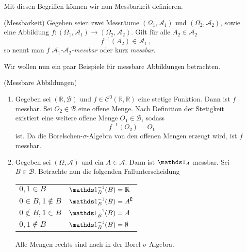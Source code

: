 \newpage

Mit diesen Begriffen können wir nun Messbarkeit definieren.

\begin{Definition}{(Messbarkeit)}
Gegeben seien zwei Messräume $(\Omega_1, \mathscr{A}_1)$ und $(\Omega_2, \mathscr{A}_2)$, sowie eine Abbildung $f: (\Omega_1, \mathscr{A}_1) \rightarrow (\Omega_2, \mathscr{A}_2)$. Gilt für alle $A_2 \in \mathscr{A}_2$
\[f^{-1}(A_2) \in \mathscr{A}_1~,\]
so nennt man $f$ \textit{$\mathscr{A}_1$-$\mathscr{A}_2$-messbar} oder kurz \textit{messbar}.
\end{Definition}

Wir wollen nun ein paar Beispiele für messbare Abbildungen betrachten.

\begin{Beispiel}{(Messbare Abbildungen)}
\begin{enumerate}[label=(\roman*)]
\item Gegeben sei $(\mathbb{R}, \mathscr{B})$ und $f \in \mathcal{C}^0(\mathbb{R}, \mathbb{R})$ eine stetige Funktion. Dann ist $f$ messbar. Sei $O_2 \in \mathscr{B}$ eine offene Menge. Nach Definition der Stetigkeit existiert eine weitere offene Menge $O_1 \in \mathscr{B}$, sodass
\[f^{-1}(O_2) = O_1\]
ist. Da die Borelschen-$\sigma$-Algebra von den offenen Mengen erzeugt wird, ist $f$ messbar.

\item Gegeben sei $(\Omega, \mathscr{A})$ und ein $A \in \mathscr{A}$. Dann ist $\indi_A$ messbar. Sei $B \in \mathscr{B}$. Betrachte nun die folgenden Fallunterscheidung

{
\renewcommand{\arraystretch}{1.5}
\begin{tabularx}{0.5\linewidth}{X X}
$0, 1 \in B$ & $\indi_B^{-1}(B) = \mathbb{R}$\\
$0 \in B, 1 \notin B$ & $\indi_B^{-1}(B) = A^\complement$\\
$0 \notin B, 1 \in B$ & $\indi_B^{-1}(B) = A$\\
$0, 1 \notin B$ & $\indi_B^{-1}(B) = \emptyset$
\end{tabularx}
}

Alle Mengen rechts sind nach \hyperlink{Def:Sigma}{} in der Borel-$\sigma$-Algebra.


\end{enumerate}
\end{Beispiel}
